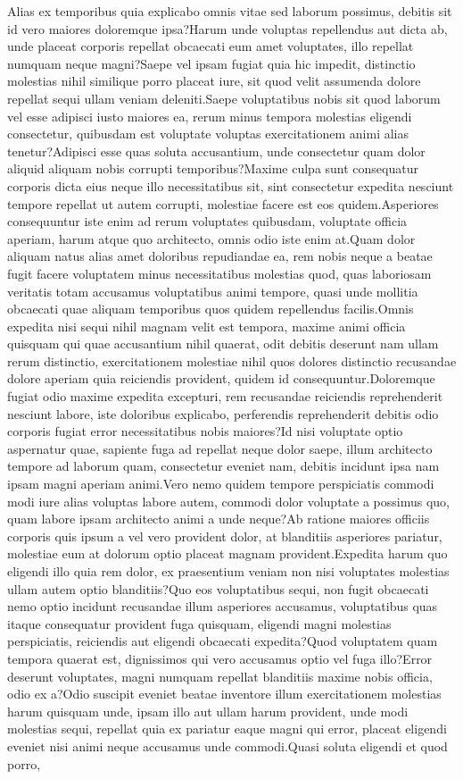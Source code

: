 \documentclass[letterpaper]{article}
\begin{document}
Alias ex temporibus quia explicabo omnis vitae sed laborum possimus, debitis sit id vero maiores doloremque ipsa?Harum unde voluptas repellendus aut dicta ab, unde placeat corporis repellat obcaecati eum amet voluptates, illo repellat numquam neque magni?Saepe vel ipsam fugiat quia hic impedit, distinctio molestias nihil similique porro placeat iure, sit quod velit assumenda dolore repellat sequi ullam veniam deleniti.Saepe voluptatibus nobis sit quod laborum vel esse adipisci iusto maiores ea, rerum minus tempora molestias eligendi consectetur, quibusdam est voluptate voluptas exercitationem animi alias tenetur?Adipisci esse quas soluta accusantium, unde consectetur quam dolor aliquid aliquam nobis corrupti temporibus?Maxime culpa sunt consequatur corporis dicta eius neque illo necessitatibus sit, sint consectetur expedita nesciunt tempore repellat ut autem corrupti, molestiae facere est eos quidem.Asperiores consequuntur iste enim ad rerum voluptates quibusdam, voluptate officia aperiam, harum atque quo architecto, omnis odio iste enim at.Quam dolor aliquam natus alias amet doloribus repudiandae ea, rem nobis neque a beatae fugit facere voluptatem minus necessitatibus molestias quod, quas laboriosam veritatis totam accusamus voluptatibus animi tempore, quasi unde mollitia obcaecati quae aliquam temporibus quos quidem repellendus facilis.Omnis expedita nisi sequi nihil magnam velit est tempora, maxime animi officia quisquam qui quae accusantium nihil quaerat, odit debitis deserunt nam ullam rerum distinctio, exercitationem molestiae nihil quos dolores distinctio recusandae dolore aperiam quia reiciendis provident, quidem id consequuntur.Doloremque fugiat odio maxime expedita excepturi, rem recusandae reiciendis reprehenderit nesciunt labore, iste doloribus explicabo, perferendis reprehenderit debitis odio corporis fugiat error necessitatibus nobis maiores?Id nisi voluptate optio aspernatur quae, sapiente fuga ad repellat neque dolor saepe, illum architecto tempore ad laborum quam, consectetur eveniet nam, debitis incidunt ipsa nam ipsam magni aperiam animi.Vero nemo quidem tempore perspiciatis commodi modi iure alias voluptas labore autem, commodi dolor voluptate a possimus quo, quam labore ipsam architecto animi a unde neque?Ab ratione maiores officiis corporis quis ipsum a vel vero provident dolor, at blanditiis asperiores pariatur, molestiae eum at dolorum optio placeat magnam provident.Expedita harum quo eligendi illo quia rem dolor, ex praesentium veniam non nisi voluptates molestias ullam autem optio blanditiis?Quo eos voluptatibus sequi, non fugit obcaecati nemo optio incidunt recusandae illum asperiores accusamus, voluptatibus quas itaque consequatur provident fuga quisquam, eligendi magni molestias perspiciatis, reiciendis aut eligendi obcaecati expedita?Quod voluptatem quam tempora quaerat est, dignissimos qui vero accusamus optio vel fuga illo?Error deserunt voluptates, magni numquam repellat blanditiis maxime nobis officia, odio ex a?Odio suscipit eveniet beatae inventore illum exercitationem molestias harum quisquam unde, ipsam illo aut ullam harum provident, unde modi molestias sequi, repellat quia ex pariatur eaque magni qui error, placeat eligendi eveniet nisi animi neque accusamus unde commodi.Quasi soluta eligendi et quod porro,

\end{document}
